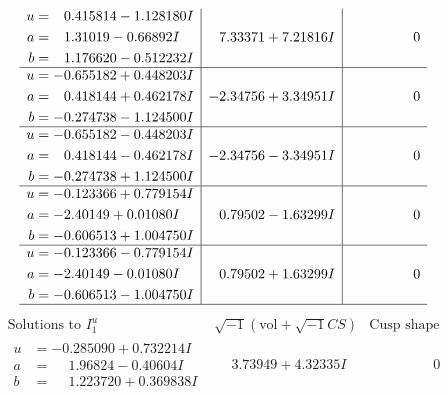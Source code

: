 \documentclass[1p]{elsarticle_modified}
\theoremstyle{definition}
\newcommand{\I}{\sqrt{-1}}
\begin{document}
$$\begin{array}{c|c|c}
\begin{aligned}
u &= \phantom{-}0.415814 - 1.128180 I \\
a &= \phantom{-}1.31019 - 0.66892 I \\
b &= \phantom{-}1.176620 - 0.512232 I\end{aligned}
 & \phantom{-}7.33371 + 7.21816 I & \phantom{-0.000000 } 0 \\ \hline\begin{aligned}
u &= -0.655182 + 0.448203 I \\
a &= \phantom{-}0.418144 + 0.462178 I \\
b &= -0.274738 - 1.124500 I\end{aligned}
 & -2.34756 + 3.34951 I & \phantom{-0.000000 } 0 \\ \hline\begin{aligned}
u &= -0.655182 - 0.448203 I \\
a &= \phantom{-}0.418144 - 0.462178 I \\
b &= -0.274738 + 1.124500 I\end{aligned}
 & -2.34756 - 3.34951 I & \phantom{-0.000000 } 0 \\ \hline\begin{aligned}
u &= -0.123366 + 0.779154 I \\
a &= -2.40149 + 0.01080 I \\
b &= -0.606513 + 1.004750 I\end{aligned}
 & \phantom{-}0.79502 - 1.63299 I & \phantom{-0.000000 } 0 \\ \hline\begin{aligned}
u &= -0.123366 - 0.779154 I \\
a &= -2.40149 - 0.01080 I \\
b &= -0.606513 - 1.004750 I\end{aligned}
 & \phantom{-}0.79502 + 1.63299 I & \phantom{-0.000000 } 0\\
 \hline 
 \end{array}$$\newpage$$\begin{array}{c|c|c}  
\text{Solutions to }I^u_{1}& \I (\text{vol} + \sqrt{-1}CS) & \text{Cusp shape}\\
 \hline 
\begin{aligned}
u &= -0.285090 + 0.732214 I \\
a &= \phantom{-}1.96824 - 0.40604 I \\
b &= \phantom{-}1.223720 + 0.369838 I\end{aligned}
 & \phantom{-}3.73949 + 4.32335 I & \phantom{-0.000000 } 0 \\ \hline\begin{aligned}

\end{aligned}
\end{array}$$
\end{document}
